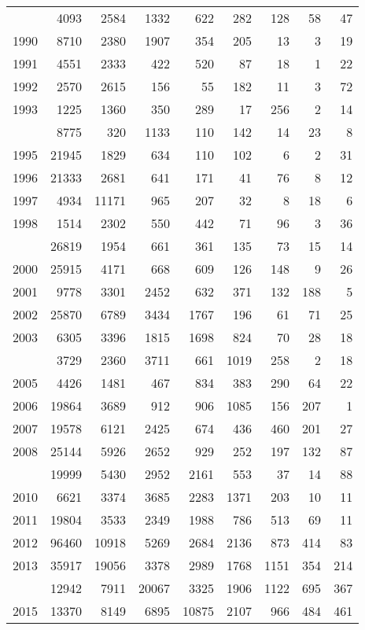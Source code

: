 \documentclass[
]{article}
\begin{document}
\begin{longtable}[t]{lrrrrrrrr}
\endfoot
\bottomrule
\endlastfoot
1989 & 4093 & 2584 & 1332 & 622 & 282 & 128 & 58 & 47\\
1990 & 8710 & 2380 & 1907 & 354 & 205 & 13 & 3 & 19\\
1991 & 4551 & 2333 & 422 & 520 & 87 & 18 & 1 & 22\\
1992 & 2570 & 2615 & 156 & 55 & 182 & 11 & 3 & 72\\
1993 & 1225 & 1360 & 350 & 289 & 17 & 256 & 2 & 14\\
\addlinespace
1994 & 8775 & 320 & 1133 & 110 & 142 & 14 & 23 & 8\\
1995 & 21945 & 1829 & 634 & 110 & 102 & 6 & 2 & 31\\
1996 & 21333 & 2681 & 641 & 171 & 41 & 76 & 8 & 12\\
1997 & 4934 & 11171 & 965 & 207 & 32 & 8 & 18 & 6\\
1998 & 1514 & 2302 & 550 & 442 & 71 & 96 & 3 & 36\\
\addlinespace
1999 & 26819 & 1954 & 661 & 361 & 135 & 73 & 15 & 14\\
2000 & 25915 & 4171 & 668 & 609 & 126 & 148 & 9 & 26\\
2001 & 9778 & 3301 & 2452 & 632 & 371 & 132 & 188 & 5\\
2002 & 25870 & 6789 & 3434 & 1767 & 196 & 61 & 71 & 25\\
2003 & 6305 & 3396 & 1815 & 1698 & 824 & 70 & 28 & 18\\
\addlinespace
2004 & 3729 & 2360 & 3711 & 661 & 1019 & 258 & 2 & 18\\
2005 & 4426 & 1481 & 467 & 834 & 383 & 290 & 64 & 22\\
2006 & 19864 & 3689 & 912 & 906 & 1085 & 156 & 207 & 1\\
2007 & 19578 & 6121 & 2425 & 674 & 436 & 460 & 201 & 27\\
2008 & 25144 & 5926 & 2652 & 929 & 252 & 197 & 132 & 87\\
\addlinespace
2009 & 19999 & 5430 & 2952 & 2161 & 553 & 37 & 14 & 88\\
2010 & 6621 & 3374 & 3685 & 2283 & 1371 & 203 & 10 & 11\\
2011 & 19804 & 3533 & 2349 & 1988 & 786 & 513 & 69 & 11\\
2012 & 96460 & 10918 & 5269 & 2684 & 2136 & 873 & 414 & 83\\
2013 & 35917 & 19056 & 3378 & 2989 & 1768 & 1151 & 354 & 214\\
\addlinespace
2014 & 12942 & 7911 & 20067 & 3325 & 1906 & 1122 & 695 & 367\\
2015 & 13370 & 8149 & 6895 & 10875 & 2107 & 966 & 484 & 461\\

\end{longtable}
\end{document}
